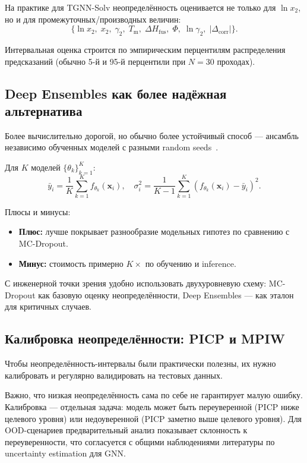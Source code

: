 \documentclass[11pt]{article}
\begin{document}
На практике для TGNN-Solv неопределённость оценивается не только для $\ln x_2$, но и для промежуточных/производных величин:
\begin{equation*}
\{\ln x_2,\; x_2,\; \gamma_2,\; T_{\mathrm{m}},\; \Delta H_{\mathrm{fus}},\; \Phi,\; \ln\gamma_2,\; |\Delta_{\mathrm{corr}}|\}.
\end{equation*}

Интервальная оценка строится по эмпирическим перцентилям распределения предсказаний (обычно 5-й и 95-й перцентили при $N=30$ проходах).

\subsection{Deep Ensembles как более надёжная альтернатива}

Более вычислительно дорогой, но обычно более устойчивый способ --- ансамбль независимо обученных моделей с разными random seeds~\cite{lakshminarayanan2017}.

Для $K$ моделей $\{\theta_k\}_{k=1}^{K}$:
\begin{equation*}
\bar{y}_i = \frac{1}{K}\sum_{k=1}^{K} f_{\theta_k}(\mathbf{x}_i), \quad
\sigma_i^2 = \frac{1}{K-1}\sum_{k=1}^{K}\left(f_{\theta_k}(\mathbf{x}_i)-\bar{y}_i\right)^2.
\end{equation*}

Плюсы и минусы:
\begin{itemize}
  \item \textbf{Плюс:} лучше покрывает разнообразие модельных гипотез по сравнению с MC-Dropout.
  \item \textbf{Минус:} стоимость примерно $K\times$ по обучению и inference.
\end{itemize}

С инженерной точки зрения удобно использовать двухуровневую схему: MC-Dropout как базовую оценку неопределённости, Deep Ensembles --- как эталон для критичных случаев.

\subsection{Калибровка неопределённости: PICP и MPIW}

Чтобы неопределённость-интервалы были практически полезны, их нужно калибровать и регулярно валидировать на тестовых данных.

Важно, что низкая неопределённость сама по себе не гарантирует малую ошибку. Калибровка --- отдельная задача: модель может быть переуверенной (PICP ниже целевого уровня) или недоуверенной (PICP заметно выше целевого уровня). Для OOD-сценариев предварительный анализ показывает склонность к переуверенности, что согласуется с общими наблюдениями литературы по uncertainty estimation для GNN.
\end{document}
